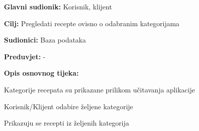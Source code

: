 					\noindent {}
					\begin{packed_item}
	
						\item \textbf{Glavni sudionik: } Korisnik, klijent
						\item  \textbf{Cilj:} Pregledati recepte ovisno o odabranim kategorijama
						\item  \textbf{Sudionici:} Baza podataka
						\item  \textbf{Preduvjet:} -
						\item  \textbf{Opis osnovnog tijeka:}
						
						\item[] \begin{packed_enum}
	
							\item Kategorije recepata su prikazane prilikom učitavanja aplikacije
							\item Korisnik/Klijent odabire željene kategorije 
							\item Prikazuju se recepti iz željenih kategorija
						\end{packed_enum}
					\end{packed_item}


